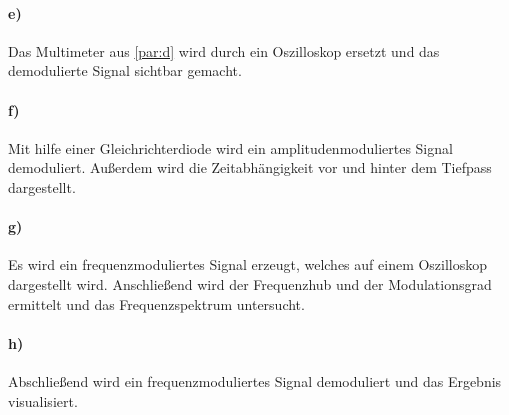 \paragraph{e)}
\label{par:e}
Das Multimeter aus \ref{par:d} wird durch ein Oszilloskop ersetzt und das demodulierte Signal sichtbar gemacht.

\paragraph{f)}
\label{par:f}
Mit hilfe einer Gleichrichterdiode wird ein amplitudenmoduliertes Signal demoduliert.
Außerdem wird die Zeitabhängigkeit vor und hinter dem Tiefpass dargestellt.

\paragraph{g)}
\label{par:g}
Es wird ein frequenzmoduliertes Signal erzeugt, welches auf einem Oszilloskop dargestellt wird. Anschließend wird der Frequenzhub und
der Modulationsgrad ermittelt und das Frequenzspektrum untersucht.

\paragraph{h)}
\label{par:h}
Abschließend wird ein frequenzmoduliertes Signal demoduliert und das Ergebnis visualisiert.
